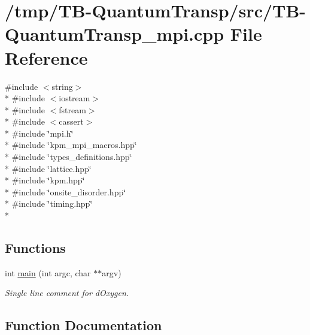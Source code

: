 \hypertarget{TB-QuantumTransp__mpi_8cpp}{}\section{/tmp/\+T\+B-\/\+Quantum\+Transp/src/\+T\+B-\/\+Quantum\+Transp\+\_\+mpi.cpp File Reference}
\label{TB-QuantumTransp__mpi_8cpp}
{\ttfamily \#include $<$string$>$}\\*
{\ttfamily \#include $<$iostream$>$}\\*
{\ttfamily \#include $<$fstream$>$}\\*
{\ttfamily \#include $<$cassert$>$}\\*
{\ttfamily \#include \char`\"{}mpi.\+h\char`\"{}}\\*
{\ttfamily \#include \char`\"{}kpm\+\_\+mpi\+\_\+macros.\+hpp\char`\"{}}\\*
{\ttfamily \#include \char`\"{}types\+\_\+definitions.\+hpp\char`\"{}}\\*
{\ttfamily \#include \char`\"{}lattice.\+hpp\char`\"{}}\\*
{\ttfamily \#include \char`\"{}kpm.\+hpp\char`\"{}}\\*
{\ttfamily \#include \char`\"{}onsite\+\_\+disorder.\+hpp\char`\"{}}\\*
{\ttfamily \#include \char`\"{}timing.\+hpp\char`\"{}}\\*
\subsection*{Functions}
\begin{DoxyCompactItemize}
\item 
int \hyperlink{TB-QuantumTransp__mpi_8cpp_a3c04138a5bfe5d72780bb7e82a18e627}{main} (int argc, char $\ast$$\ast$argv)
\begin{DoxyCompactList}\small\item\em Single line comment for d\+Oxygen. \end{DoxyCompactList}\end{DoxyCompactItemize}


\subsection{Function Documentation}
